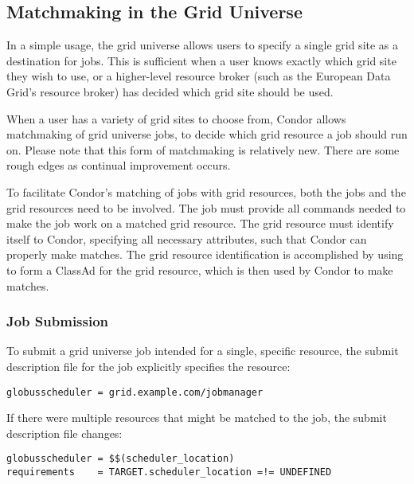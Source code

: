 \subsection{\label{sec:Grid-Matchmaking}Matchmaking in the Grid Universe}

In a simple usage, the grid universe allows users to specify a single
grid site as a destination for jobs.
This is sufficient when a user knows exactly which
grid site they wish to use,
or a higher-level resource broker
(such as the European Data Grid's resource broker)
has decided which grid site should be used.

When a user has a variety of grid sites to choose from,
Condor allows matchmaking of grid universe jobs,
to decide which grid resource a job should run on. 
Please note that this form of matchmaking is relatively new.
There are some rough edges as continual improvement occurs.

To facilitate Condor's matching of jobs with grid resources,
both the jobs and the grid resources need to be involved.
The job must provide all commands needed to make the
job work on a matched grid resource.
The grid resource must identify itself to Condor,
specifying all necessary attributes, such that Condor
can properly make matches.
The grid resource identification is accomplished by 
using  to form a ClassAd for the
grid resource, which is then used by Condor to make matches.

\subsubsection{Job Submission}

To submit a grid universe job intended for a single, specific
 resource,
the submit description file for the job explicitly specifies
the resource:

\footnotesize
\begin{verbatim}
globusscheduler = grid.example.com/jobmanager
\end{verbatim}
\normalsize

If there were multiple  resources that
might be matched to the job,
the submit description file changes:

\footnotesize
\begin{verbatim}
globusscheduler = $$(scheduler_location)
requirements    = TARGET.scheduler_location =!= UNDEFINED
\end{verbatim}
\normalsize

